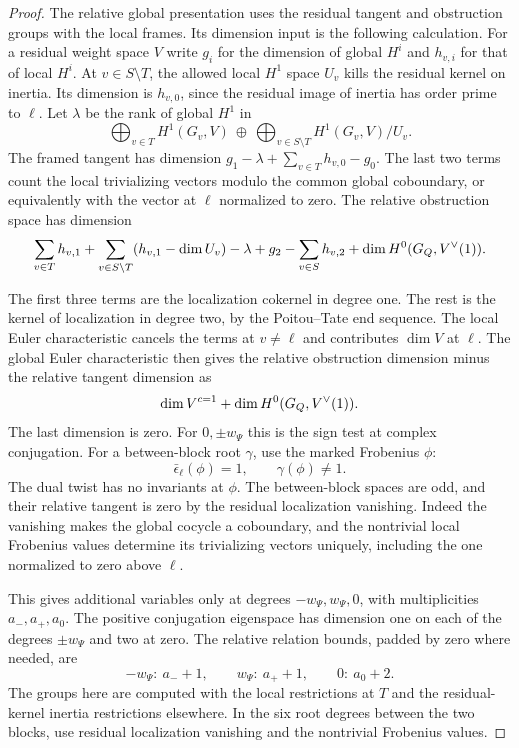 \begin{proof}
The relative global presentation uses the residual tangent and obstruction groups with the local frames. Its dimension input is the following calculation.
For a residual weight space \(V\) write \(g_i\) for the
dimension of global \(H^i\) and \(h_{v,i}\) for that of
local \(H^i\). At \(v\in S\setminus T\), the allowed
local \(H^1\) space \(U_v\) kills the residual kernel
on inertia. Its dimension is \(h_{v,0}\), since the
residual image of inertia has order prime to \(\ell\).
Let \(\lambda\) be the rank of global \(H^1\) in
\[
 \bigoplus_{v\in T}H^1(G_v,V)\ \oplus\
              \bigoplus_{v\in S\setminus T}H^1(G_v,V)/U_v .
\]
The framed tangent has dimension \(g_1-\lambda+
\sum_{v\in T}h_{v,0}-g_0\). The last two terms count
the local trivializing vectors modulo the common global
coboundary, or equivalently with the vector at \(\ell\)
normalized to zero. The relative obstruction space has
dimension
\[
  \sum_{v\in T}h_{v,1}
  +\sum_{v\in S\setminus T}(h_{v,1}-\dim U_v)-\lambda
  +g_2-\sum_{v\in S}h_{v,2}
  +\dim H^0(G_Q,V^\vee(1)).
\]

The first three terms are the localization cokernel in
degree one. The rest is the kernel of localization in
degree two, by the Poitou--Tate end sequence.
The local Euler characteristic cancels the terms at
\(v\ne\ell\) and contributes \(\dim V\) at \(\ell\).
The global Euler characteristic then gives the relative
obstruction dimension minus the relative tangent dimension as
\[
         \dim V^{c=1}+\dim H^0(G_Q,V^\vee(1)).
\]
The last dimension is zero. For \(0,\pm w_\Psi\) this is
the sign test at complex conjugation. For a between-block
root \(\gamma\), use the marked Frobenius \(\phi\):
\[
        \bar\epsilon_\ell(\phi)=1,\qquad\gamma(\phi)\ne1 .
\]
The dual twist has no invariants at \(\phi\). The between-block
spaces are odd, and their relative tangent is zero
by the residual localization vanishing. Indeed the
vanishing makes the global cocycle a coboundary, and
the nontrivial local Frobenius values determine its
trivializing vectors uniquely, including the one
normalized to zero above \(\ell\).

This gives additional variables only at degrees
\(-w_\Psi,w_\Psi,0\), with multiplicities \(a_-,a_+,a_0\).
The positive conjugation eigenspace has dimension one on
each of the degrees \(\pm w_\Psi\) and two at zero.
The relative relation bounds, padded by zero where needed, are
\[
  -w_\Psi:\ a_-+1,\qquad
    w_\Psi:\ a_++1,\qquad 0:\ a_0+2 .
\] The groups here are computed with the local
restrictions at \(T\) and the residual-kernel inertia restrictions
elsewhere. In the six root degrees between the two blocks, use residual localization vanishing and the nontrivial Frobenius values.


\end{proof}
